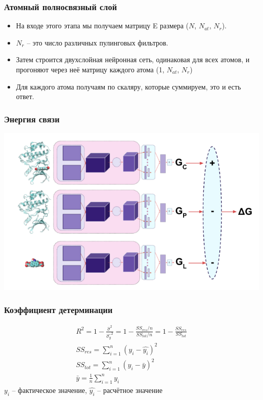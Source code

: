 \documentclass{beamer}
\begin{document}
\begin{frame}
\frametitle{Атомный полносвязный слой}
\begin{itemize}
\pause
\item На входе этого этапа мы получаем матрицу E размера ($N$, $N_{at}$, $N_{r}$).\pause
\item $N_r$ -- это число различных пулинговых фильтров.\pause
\item Затем строится двухслойная нейронная сеть, одинаковая для всех атомов, и прогоняют через неё матрицу каждого атома (1, $N_{at}$, $N_r$)\pause
\item Для каждого атома получаям по скаляру, которые суммируем, это и есть ответ.
\end{itemize}
\end{frame}

\begin{frame}
\frametitle{Энергия связи}\begin{center}
\includegraphics[scale=0.4]{energy.png}
\end{center}
\end{frame}

\begin{frame}
\frametitle{Коэффициент детерминации}
\begin{gather*}
R^2 = 1 - \frac{\hat{\sigma}^2}{\hat{\sigma_y}^2} = 1 - \frac{SS_{res} / n}{SS_{tot} / n} = 1 - \frac{SS_{res}}{SS_{tot}}\\
SS_{res} = \sum_{i = 1}^{n} (y_i - \hat{y_i})^2\\
SS_{tot} = \sum_{i=1}^{n} (y_i - \bar{y})^2\\
\bar{y} = \frac{1}{n}\sum_{i=1}^n y_i
\end{gather*}
$y_i$ --  фактическое значение, $\hat{y_i}$ -- расчётное значение
\end{frame}
\end{document}
